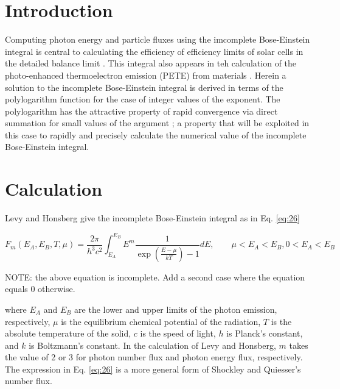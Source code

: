 \documentclass[letterpaper,12pt]{article}
\title{\Title}
\author{\AuthorName}
\begin{document}
\maketitle


\begin{abstract}

\end{abstract}


\section{Introduction}
Computing photon energy and particle fluxes using the imcomplete Bose-Einstein integral is central to calculating the efficiency of efficiency limits of solar cells in the detailed balance limit \cite{10.1063/1.1736034}. This integral also appears in teh calculation of the photo-enhanced thermoelectron emission (PETE) from materials \cite{10.1038/nmat2814}. Herein a solution to the incomplete Bose-Einstein integral is derived in terms of the polylogarithm function for the case of integer values of the exponent. The polylogarithm has the attractive property of rapid convergence via direct summation for small values of the argument \cite{http://academic.reed.edu/physics/faculty/crandall/papers/Polylog}; a property that will be exploited in this case to rapidly and precisely calculate the numerical value of the incomplete Bose-Einstein integral.


\section{Calculation}
Levy and Honsberg \cite{10.1016/j.sse.2006.06.017} give the incomplete Bose-Einstein integral as in Eq. \ref{eq:26}

\begin{equation} \label{eq:26}
F_{m}(E_{A},E_{B},T,\mu) = \frac{2 \pi}{h^{3}c^{2}} \int_{E_{A}}^{E_{B}} E^{m} \frac{1}{\exp \left( \frac{E - \mu}{kT} \right) - 1} dE, \qquad \mu < E_{A} < E_{B}, 0 < E_{A} < E_{B}
\end{equation}

NOTE: the above equation is incomplete. Add a second case where the equation equals 0 otherwise.

\noindent where $E_{A}$ and $E_{B}$ are the lower and upper limits of the photon emission, respectively, $\mu$ is the equilibrium chemical potential of the radiation, $T$ is the absolute temperature of the solid, $c$ is the speed of light, $h$ is Planck's constant, and $k$ is Boltzmann's constant. In the calculation of Levy and Honsberg, $m$ takes the value of 2 or 3 for photon number flux and photon energy flux, respectively. The expression in Eq. \ref{eq:26} is a more general form of Shockley and Quiesser's number flux.
\end{document}
